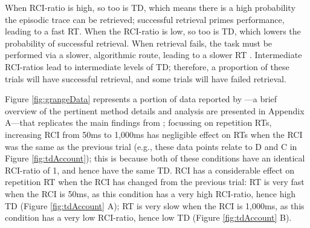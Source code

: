 \documentclass[a4paper, jou, natbib]{apa6}
\begin{document}
When RCI-ratio is high, so too is TD, which means there is a high probability the episodic trace can be retrieved; successful retrieval primes performance, leading to a fast RT. When the RCI-ratio is low, so too is TD, which lowers the probability of successful retrieval. When retrieval fails, the task must be performed via a slower, algorithmic route, leading to a slower RT \citep[see][for a similar proposal]{Logan2002}. Intermediate RCI-ratios lead to intermediate levels of TD; therefore, a proportion of these trials will have successful retrieval, and some trials will have failed retrieval. 

Figure \ref{fig:grangeData} represents a portion of data reported by \cite{Grangeinrevision}---a brief overview of the pertinent method details and analysis are presented in Appendix A---that replicates the main findings from \cite{Horoufchin2011a}; focussing on repetition RTs, increasing RCI from 50ms to 1,000ms has negligible effect on RTs when the RCI was the same as the previous trial (e.g., these data points relate to D and C in Figure \ref{fig:tdAccount}); this is because both of these conditions have an identical RCI-ratio of 1, and hence have the same TD. RCI has a considerable effect on repetition RT when the RCI has changed from the previous trial: RT is very fast when the RCI is 50ms, as this condition has a very high RCI-ratio, hence high TD (Figure \ref{fig:tdAccount} A); RT is very slow when the RCI is 1,000ms, as this condition has a very low RCI-ratio, hence low TD (Figure \ref{fig:tdAccount} B). 
\end{document}
